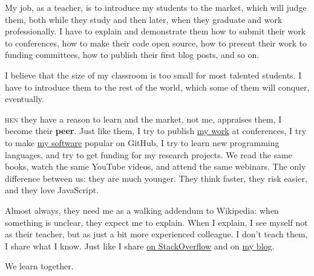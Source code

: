 \documentclass{./yb}
\newcommand\first[2]{\vspace{1em}{\setlength{\parindent}{0pt}\bfseries\LARGE #1}\textsc{#2}}
\begin{document}
My job, as a teacher, is to introduce my students to the market, which will
judge them, both while they study and then later, when they graduate and work
professionally. I have to explain and
demonstrate them how to submit their work to conferences, how to make
their code open source, how to present their work to funding committees,
how to publish their first blog posts, and so on.

I believe that the size of my classroom is too small for most talented students.
I have to introduce them to the rest of the world, which some of them will conquer, eventually.

\first{W}{hen} they have a reason to learn and the market, not me, appraises
them, I become their \textbf{peer}. Just like them, I try to publish
\href{https://www.yegor256.com/papers.html}{my work} at conferences,
I try to make \href{https://github.com/yegor256}{my software}
popular on GitHub, I try to learn new programming
languages, and try to get funding for my research projects.
We read the same books, watch the same YouTube videos, and attend the same webinars.
The only difference between us: they are much younger. They
think faster, they risk easier, and they love JavaScript.

Almost always, they need me as a walking addendum to Wikipedia:
when something is unclear, they expect me to explain. When I explain,
I see myself not as their teacher, but as just a bit more experienced colleague.
I don't teach them, I share what I know. Just like I share
\href{http://stackoverflow.com/users/187141/yegor256}{on StackOverflow}
and on \href{https://www.yegor256.com}{my blog}.

We learn together.
\end{document}
